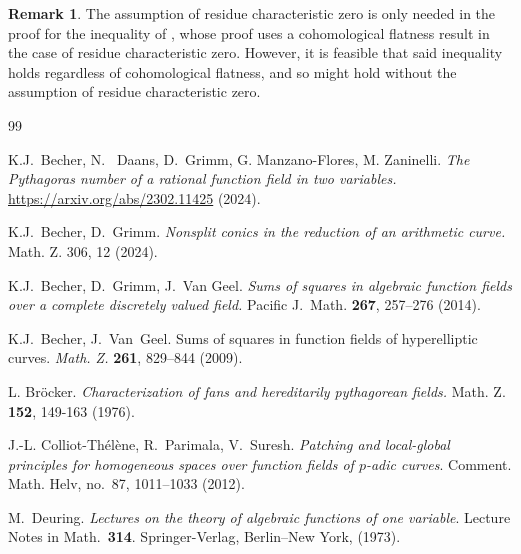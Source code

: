 \documentclass[a4paper,12pt,reqno]{amsart}
\theoremstyle{definition}
\newtheorem{rem}[thm]{Remark}
\numberwithin{equation}{thm}
\begin{document}
\begin{rem}
The assumption of residue characteristic zero is only needed in the proof for the inequality of , whose proof uses a cohomological flatness result in the case of residue characteristic zero. However, it is feasible that said inequality holds regardless of cohomological flatness, and so  might hold without the assumption of residue characteristic zero.
\end{rem}

\begin{thebibliography}{99}

 K.J.~Becher, N.~ Daans, D.~Grimm, G. Manzano-Flores, M. Zaninelli. \textit{The Pythagoras number of a rational function field in two variables.}
\url{https://arxiv.org/abs/2302.11425} (2024).

 K.J.~Becher, D.~Grimm. \textit{Nonsplit conics in the reduction of an arithmetic curve.} Math. Z. 306, 12 (2024).

K.J.~Becher, D.~Grimm, J.~Van Geel. \textit{Sums of squares in algebraic function fields over a complete discretely valued field.} Pacific J.~Math. {\bf 267}, 257--276 (2014).






 

 K.J.~Becher, J.~Van~Geel.
{Sums of squares in function fields of hyperelliptic curves}. \textit{Math. Z.} {\bf 261}, 829--844 (2009).



L. Br\"ocker. \textit{Characterization of fans and hereditarily pythagorean fields.} Math. Z. \textbf{152}, 149-163 (1976).

J.-L. Colliot-Th\'el\`ene, R.~Parimala, V.~Suresh. \textit{Patching and
  local-global principles for homogeneous spaces over function fields of
  $p$-adic curves}. Comment. Math. Helv, no.~87, 1011--1033 (2012).


   M.~Deuring.
\textit{Lectures on the theory of algebraic functions of one variable}. Lecture
Notes in Math.~{\bf 314}. Springer-Verlag, Berlin--New York, (1973). 




\end{thebibliography}
\end{document}

